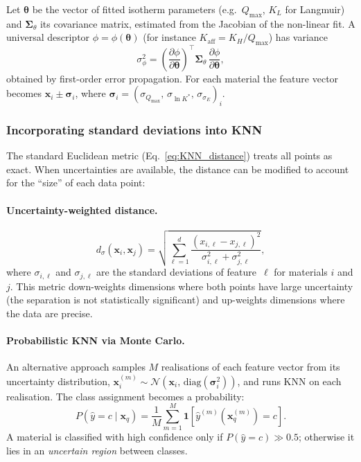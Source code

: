 \documentclass[12pt]{article}
\begin{document}
	Let $\boldsymbol{\theta}$ be the vector of fitted isotherm
	parameters (e.g.\ $Q_{\max}$, $K_L$ for Langmuir) and
	$\boldsymbol{\Sigma}_{\theta}$ its covariance matrix, estimated
	from the Jacobian of the non-linear fit.  A universal descriptor
	$\phi = \phi(\boldsymbol{\theta})$ (for instance
	$K_{\mathrm{aff}} = K_H / Q_{\max}$) has variance
	\begin{equation}
		\sigma_\phi^2
		= \left(\frac{\partial\phi}{\partial\boldsymbol{\theta}}
		\right)^{\!\top}
		\boldsymbol{\Sigma}_{\theta}\,
		\frac{\partial\phi}{\partial\boldsymbol{\theta}},
		\label{eq:error_prop}
	\end{equation}
	obtained by first-order error propagation.  For each material
	the feature vector becomes
	$\mathbf{x}_i \pm \boldsymbol{\sigma}_i$, where
	$\boldsymbol{\sigma}_i
	= (\sigma_{Q_{\max}},\, \sigma_{\ln K^{\ast}},\,
	\sigma_{\sigma_E})_i$.

	\subsubsection{Incorporating standard deviations into KNN}

	The standard Euclidean metric
	(Eq.~\eqref{eq:KNN_distance}) treats all points as exact.
	When uncertainties are available, the distance can be
	modified to account for the ``size'' of each data point:

	\paragraph{Uncertainty-weighted distance.}
	\begin{equation}
		d_{\sigma}(\mathbf{x}_i, \mathbf{x}_j)
		= \sqrt{\sum_{\ell=1}^{d}
			\frac{(x_{i,\ell} - x_{j,\ell})^2}
			{\sigma_{i,\ell}^2 + \sigma_{j,\ell}^2}},
		\label{eq:KNN_sigma_distance}
	\end{equation}
	where $\sigma_{i,\ell}$ and $\sigma_{j,\ell}$ are the standard
	deviations of feature~$\ell$ for materials $i$ and $j$.
	This metric down-weights dimensions where both points have
	large uncertainty (the separation is not statistically
	significant) and up-weights dimensions where the data are
	precise.

	\paragraph{Probabilistic KNN via Monte Carlo.}
	An alternative approach samples $M$ realisations of each
	feature vector from its uncertainty distribution,
	$\mathbf{x}_i^{(m)} \sim \mathcal{N}(\mathbf{x}_i,\,
	\mathrm{diag}(\boldsymbol{\sigma}_i^2))$,
	and runs KNN on each realisation.  The class assignment
	becomes a probability:
	\begin{equation}
		P(\hat{y} = c \mid \mathbf{x}_q)
		= \frac{1}{M}\sum_{m=1}^{M}
		\mathbf{1}\!\left[
			\hat{y}^{(m)}(\mathbf{x}_q^{(m)}) = c
			\right].
		\label{eq:KNN_MC}
	\end{equation}
	A material is classified with high confidence only if
	$P(\hat{y} = c) \gg 0.5$; otherwise it lies in an
	\emph{uncertain region} between classes.
\end{document}
